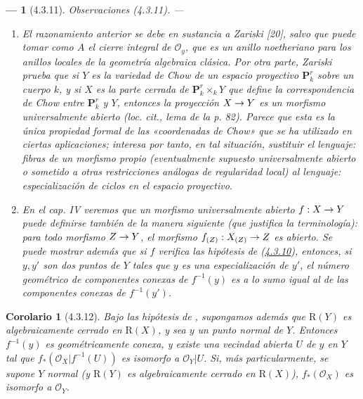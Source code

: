 \documentclass[10pt,oneside,openany]{book}
\theoremstyle{egaenv}\newtheorem*{env}{---}
\theoremstyle{egastatement}
\newtheorem*{corollary}{Corolario}
\theoremstyle{egadescription}
\renewcommand{\to}{\mathchoice{\longrightarrow}{\rightarrow}{\rightarrow}{\rightarrow}}
\begin{document}
\begin{env}[4.3.11]
\label{III.4.3.11-fr}
\emph{Observaciones} (4.3.11). ---
\begin{enumerate}
\item[(i)] El razonamiento anterior se debe en sustancia a Zariski [20],
salvo que puede tomar como $A$ el cierre integral de
$\mathcal O_y$, que es un anillo noetheriano para los anillos locales
de la geometría algebraica clásica. Por otra parte, Zariski prueba que si
$Y$ es la variedad de Chow de un espacio proyectivo $\mathbf P_k^r$ sobre un
cuerpo $k$, y si $X$ es la parte cerrada de $\mathbf P_k^r\times_kY$ que
define la correspondencia de Chow entre $\mathbf P_k^r$ y $Y$, entonces la
proyección $X\to Y$ es un morfismo universalmente abierto
(\emph{loc. cit.}, lema de la p. 82). Parece que esta es la única
propiedad formal de las «coordenadas de Chow» que se ha utilizado en
ciertas aplicaciones; interesa por tanto, en tal situación,
sustituir el lenguaje: fibras de un morfismo propio (eventualmente
supuesto universalmente abierto o sometido a otras restricciones análogas
de regularidad local) al lenguaje: especialización de ciclos en el espacio
proyectivo.

\item[(ii)] En el cap. IV veremos que un morfismo universalmente abierto
$f:X\to Y$ puede definirse también de la manera siguiente (que justifica la
terminología): para \emph{todo} morfismo $Z\to Y$, el morfismo
$f_{(Z)}:X_{(Z)}\to Z$ es \emph{abierto}. Se puede mostrar además que si $f$
verifica las hipótesis de (\hyperref[III.4.3.10-fr]{4.3.10}), entonces, si
$y,y'$ son dos puntos de $Y$ tales que $y$ es una \emph{especialización} de $y'$,
el número geométrico de componentes conexas de $f^{-1}(y)$ es a lo sumo
igual al de las componentes conexas de $f^{-1}(y')$.
\end{enumerate}
\end{env}

\begin{corollary}[4.3.12]
\label{III.4.3.12}
\label{III.4.3.12-fr}
Bajo las hipótesis de \textup{}, supongamos además que
$\mathrm R(Y)$ es algebraicamente cerrado en $\mathrm R(X)$, y sea
$y$ un punto normal de $Y$. Entonces $f^{-1}(y)$ es geométricamente
conexa, y existe una vecindad abierta $U$ de $y$ en $Y$ tal que
$f_*(\mathcal O_X|f^{-1}(U))$ es isomorfo a $\mathcal O_Y|U$. Si, más
particularmente, se supone $Y$ normal (y $\mathrm R(Y)$ es algebraicamente
cerrado en $\mathrm R(X)$), $f_*(\mathcal O_X)$ es isomorfo a
$\mathcal O_Y$.
\end{corollary}
\end{document}
